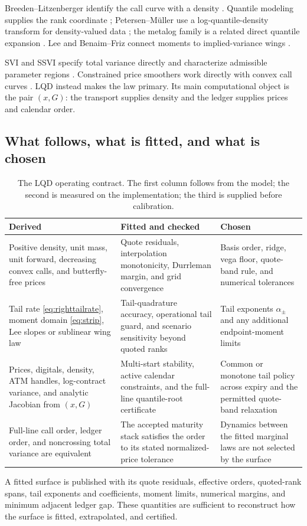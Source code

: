 Breeden--Litzenberger identify the call curve with a density
\citep{BreedenLitzenberger1978}.  Quantile modeling supplies the rank
coordinate \citep{Parzen1979,Gilchrist2000}; Petersen--M\"uller use a
log-quantile-density transform for density-valued data
\citep{PetersenMuller2016}; the metalog family is a related direct quantile
expansion \citep{Keelin2016}.  Lee and Benaim--Friz connect moments to
implied-variance wings \citep{Lee2004,BenaimFriz2009}.

SVI and SSVI specify total variance directly and characterize admissible
parameter regions \citep{Gatheral2004,GatheralJacquier2014}.  Constrained
price smoothers work directly with convex call curves \citep{Fengler2009}.
LQD instead makes the law primary.  Its main computational object is the
pair $(x,G)$: the transport supplies density and the ledger supplies prices
and calendar order.

\subsection{What follows, what is fitted, and what is chosen}
\label{sec:limits}

\begin{table}[htbp]
\centering\small
\begin{tabular}{@{}>{\raggedright\arraybackslash}p{}
>{\raggedright\arraybackslash}p{}
>{\raggedright\arraybackslash}p{}@{}}
\toprule
\textbf{Derived} & \textbf{Fitted and checked} & \textbf{Chosen}\\
\midrule
Positive density, unit mass, unit forward, decreasing convex calls, and
butterfly-free prices & Quote residuals, interpolation monotonicity,
Durrleman margin, and grid convergence & Basis order, ridge, vega floor,
quote-band rule, and numerical tolerances\\[4pt]
Tail rate \eqref{eq:righttailrate}, moment domain \eqref{eq:strip}, Lee slopes
or sublinear wing law & Tail-quadrature accuracy, operational tail guard, and
scenario sensitivity beyond quoted ranks & Tail exponents $\alpha_\pm$ and
any additional endpoint-moment limits\\[4pt]
Prices, digitals, density, ATM handles, log-contract variance, and analytic
Jacobian from $(x,G)$ & Multi-start stability, active calendar constraints,
and the full-line quantile-root certificate & Common or monotone tail policy
across expiry and the permitted quote-band relaxation\\[4pt]
Full-line call order, ledger order, and noncrossing total variance are
equivalent & The accepted maturity stack satisfies the order to its stated
normalized-price tolerance & Dynamics between the fitted marginal laws are
not selected by the surface\\
\bottomrule
\end{tabular}
\caption{The LQD operating contract.  The first column follows from the
model; the second is measured on the implementation; the third is supplied
before calibration.}
\label{tab:contract}
\end{table}

A fitted surface is published with its quote residuals, effective orders,
quoted-rank spans, tail exponents and coefficients, moment limits, numerical
margins, and minimum adjacent ledger gap.  These quantities are sufficient to
reconstruct how the surface is fitted, extrapolated, and certified.
